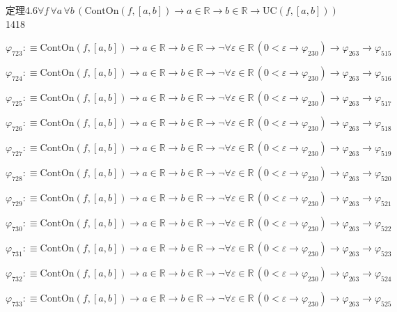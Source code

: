 \begin{fullproof}{定理4.6}{$\forall f\,\forall a\,\forall b\,(\mathrm{ContOn}(f,[a,b]) \to a \in \mathbb{R} \to b \in \mathbb{R} \to \mathrm{UC}(f,[a,b]))$}{1418}
\begin{abbrevlist}
\item $\varphi_{723} :\equiv \mathrm{ContOn}(f,[a,b]) \to a \in \mathbb{R} \to b \in \mathbb{R} \to \neg \forall \varepsilon \in \mathbb{R}\,(0 < \varepsilon \to \varphi_{230}) \to \varphi_{263} \to \varphi_{515}$
\item $\varphi_{724} :\equiv \mathrm{ContOn}(f,[a,b]) \to a \in \mathbb{R} \to b \in \mathbb{R} \to \neg \forall \varepsilon \in \mathbb{R}\,(0 < \varepsilon \to \varphi_{230}) \to \varphi_{263} \to \varphi_{516}$
\item $\varphi_{725} :\equiv \mathrm{ContOn}(f,[a,b]) \to a \in \mathbb{R} \to b \in \mathbb{R} \to \neg \forall \varepsilon \in \mathbb{R}\,(0 < \varepsilon \to \varphi_{230}) \to \varphi_{263} \to \varphi_{517}$
\item $\varphi_{726} :\equiv \mathrm{ContOn}(f,[a,b]) \to a \in \mathbb{R} \to b \in \mathbb{R} \to \neg \forall \varepsilon \in \mathbb{R}\,(0 < \varepsilon \to \varphi_{230}) \to \varphi_{263} \to \varphi_{518}$
\item $\varphi_{727} :\equiv \mathrm{ContOn}(f,[a,b]) \to a \in \mathbb{R} \to b \in \mathbb{R} \to \neg \forall \varepsilon \in \mathbb{R}\,(0 < \varepsilon \to \varphi_{230}) \to \varphi_{263} \to \varphi_{519}$
\item $\varphi_{728} :\equiv \mathrm{ContOn}(f,[a,b]) \to a \in \mathbb{R} \to b \in \mathbb{R} \to \neg \forall \varepsilon \in \mathbb{R}\,(0 < \varepsilon \to \varphi_{230}) \to \varphi_{263} \to \varphi_{520}$
\item $\varphi_{729} :\equiv \mathrm{ContOn}(f,[a,b]) \to a \in \mathbb{R} \to b \in \mathbb{R} \to \neg \forall \varepsilon \in \mathbb{R}\,(0 < \varepsilon \to \varphi_{230}) \to \varphi_{263} \to \varphi_{521}$
\item $\varphi_{730} :\equiv \mathrm{ContOn}(f,[a,b]) \to a \in \mathbb{R} \to b \in \mathbb{R} \to \neg \forall \varepsilon \in \mathbb{R}\,(0 < \varepsilon \to \varphi_{230}) \to \varphi_{263} \to \varphi_{522}$
\item $\varphi_{731} :\equiv \mathrm{ContOn}(f,[a,b]) \to a \in \mathbb{R} \to b \in \mathbb{R} \to \neg \forall \varepsilon \in \mathbb{R}\,(0 < \varepsilon \to \varphi_{230}) \to \varphi_{263} \to \varphi_{523}$
\item $\varphi_{732} :\equiv \mathrm{ContOn}(f,[a,b]) \to a \in \mathbb{R} \to b \in \mathbb{R} \to \neg \forall \varepsilon \in \mathbb{R}\,(0 < \varepsilon \to \varphi_{230}) \to \varphi_{263} \to \varphi_{524}$
\item $\varphi_{733} :\equiv \mathrm{ContOn}(f,[a,b]) \to a \in \mathbb{R} \to b \in \mathbb{R} \to \neg \forall \varepsilon \in \mathbb{R}\,(0 < \varepsilon \to \varphi_{230}) \to \varphi_{263} \to \varphi_{525}$

\end{abbrevlist}
\end{fullproof}
